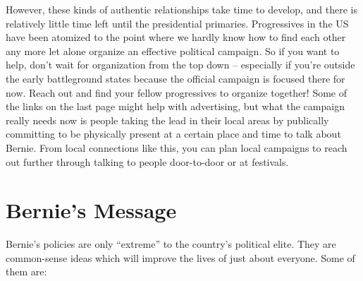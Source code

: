 \documentclass[notumble]{leaflet}
\begin{document}
However, these kinds of authentic relationships take time to develop,
and there is relatively little time left until the presidential
primaries.  Progressives in the US have been atomized to the point
where we hardly know how to find each other any more let alone
organize an effective political campaign.  So if you want to help,
don't wait for organization from the top down -- especially if you're
outside the early battleground states because the official campaign is
focused there for now.  Reach out and find your fellow progressives to
organize together!  Some of the links on the last page might help with
advertising, but what the campaign really needs now is people taking
the lead in their local areas by publically committing to be
physically present at a certain place and time to talk about Bernie.
From local connections like this, you can plan local campaigns to
reach out further through talking to people door-to-door or at
festivals.

\pagebreak

\section*{Bernie's Message}

Bernie's policies are only ``extreme'' to the country's political
elite.  They are common-sense ideas which will improve the lives of
just about everyone.  Some of them are:
\end{document}

